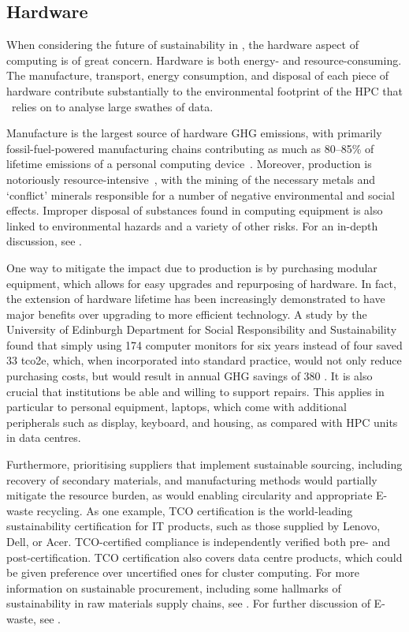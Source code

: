 \documentclass[../SustainableHEP.tex]{subfiles}
\begin{document}

\newpage

\subsection{Hardware}
\label{subsec:hardware}

When considering the future of sustainability in \ACR, the hardware aspect of computing is of great concern. Hardware is both energy- and resource-consuming. The manufacture, transport, energy consumption, and disposal of each piece of hardware contribute substantially to the environmental footprint of the HPC that \ACR\ relies on to analyse large swathes of data. 

Manufacture is the largest source of hardware GHG emissions, with primarily fossil-fuel-powered manufacturing chains contributing as much as 80--85\% of lifetime emissions of a personal computing device~\cite{Greenpeace_Oeko, OxfordLCA}.  Moreover, production is notoriously resource-intensive~\cite{Greenpeace_Oeko}, with the mining of the necessary metals and `conflict' minerals responsible for a number of negative environmental and social effects.  Improper disposal of substances found in computing equipment is also linked to environmental hazards and a variety of other risks.    For an in-depth discussion, see .

One way to mitigate the impact due to production is by purchasing modular equipment, which allows for easy upgrades and repurposing of hardware.  In fact, the extension of hardware lifetime has been increasingly demonstrated to have major benefits over upgrading to more efficient technology.  A study by the University of Edinburgh Department for Social Responsibility and Sustainability~\cite{UniEd} found that simply using 174 computer monitors for six years instead of four saved 33 \acrshort{tco2e}, which, when incorporated into standard practice, would not only reduce purchasing costs, but would result in annual GHG savings of 380 \tCdOe.  It is also crucial that institutions be able and willing to support repairs. This applies in particular to personal equipment, \eg laptops,  which come with additional peripherals such as display, keyboard, and housing, as compared with HPC units in data centres. 

Furthermore, prioritising suppliers that implement sustainable sourcing, including recovery of secondary materials, and manufacturing methods would partially mitigate the resource burden, as would enabling circularity and appropriate E-waste recycling.  As one example, TCO certification \cite{TCO_Certified} is the world-leading sustainability certification for IT products, such as those supplied by Lenovo, Dell, or Acer. TCO-certified compliance is independently verified both pre- and post-certification. TCO certification also covers data centre products, which could be given preference over uncertified ones for cluster computing. For more information on sustainable procurement, including some hallmarks of sustainability in raw materials supply chains, see .  For further discussion of E-waste, see .
\end{document}
